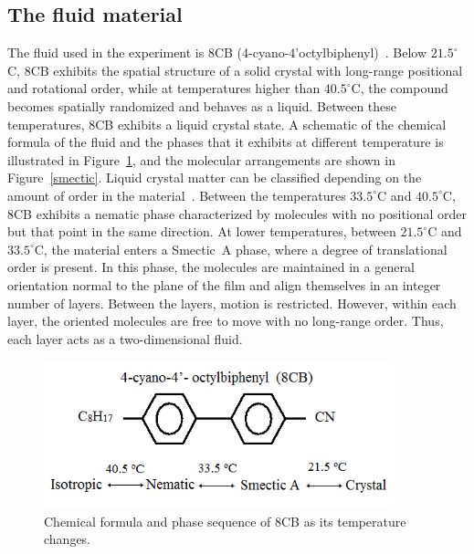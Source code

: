 \subsection{The fluid material}
The fluid used in the experiment is 8CB (4-cyano-4'octylbiphenyl)~\cite{AEWSDaDe}. Below $21.5^{\circ}$C, 8CB exhibits the spatial structure of a solid crystal with long-range positional and rotational order, while at temperatures higher than $40.5^{\circ}$C, the compound becomes spatially randomized and behaves as a liquid. Between these temperatures, 8CB exhibits a liquid crystal state. A schematic of the chemical formula of the fluid and the phases that it exhibits at different temperature is illustrated in Figure~\ref{8CB}, and the molecular arrangements are shown in Figure~\ref{smectic}.
Liquid crystal matter can be classified depending on the amount of order in the material~\cite{book2012liquid}. Between the temperatures $33.5^\circ$C and $40.5^{\circ}$C, 8CB exhibits a nematic phase characterized by molecules with no positional order but that point in the same direction. At lower temperatures, between $21.5^{\circ}$C and $33.5^{\circ}$C, the material enters a Smectic~A phase, where a degree of translational order is present.  In this phase, the molecules are maintained in a general orientation normal to the plane of the film and align themselves in an integer number of layers. Between the layers, motion is restricted. However, within each layer, the oriented molecules are free to move with no long-range order. Thus, each layer acts as a two-dimensional fluid.

\begin{figure}[tbh]
\centerline{\includegraphics[width =0.9\textwidth]{./figures/Pictures/8CB.png}}
\caption{Chemical formula and phase sequence of 8CB as its temperature changes.}
\label{8CB}
\end{figure}


